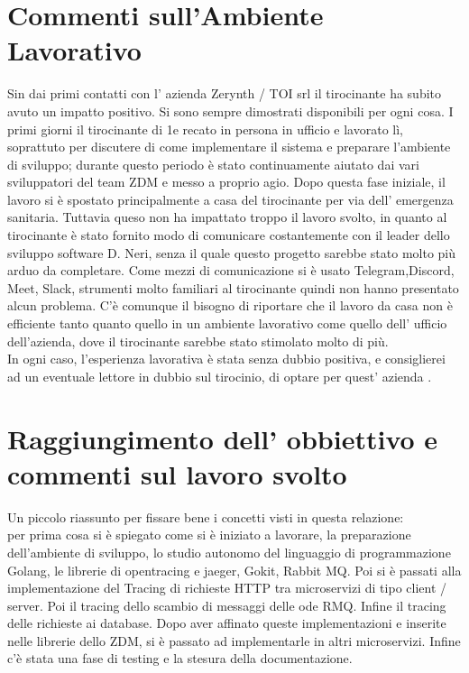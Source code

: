 \documentclass[a4paper,12pt,titlepage,italian,openany]{report}
\begin{document}
\section{Commenti sull'Ambiente Lavorativo}
Sin dai primi contatti con l' azienda Zerynth / TOI srl il tirocinante ha subito avuto un impatto positivo. Si sono sempre dimostrati disponibili per ogni cosa.
I primi giorni il tirocinante di 1e recato in persona in ufficio e lavorato lì, soprattuto per discutere di come implementare il sistema e preparare l'ambiente di sviluppo; durante questo periodo è stato continuamente aiutato dai vari sviluppatori del team ZDM\cite{zdm:1} e messo a proprio agio.
Dopo questa fase iniziale, il lavoro si è spostato principalmente a casa del tirocinante per via dell' emergenza sanitaria. Tuttavia queso non ha impattato troppo il lavoro svolto, in quanto al tirocinante è stato fornito modo di comunicare costantemente con il leader dello sviluppo software D. Neri, senza il quale questo progetto sarebbe stato molto più arduo da completare.
Come mezzi di comunicazione si è usato Telegram,Discord, Meet, Slack, strumenti molto familiari al tirocinante quindi non hanno presentato alcun problema. C'è comunque il bisogno di riportare che il lavoro da casa non è efficiente tanto quanto quello in un ambiente lavorativo come quello dell' ufficio dell'azienda, dove il tirocinante sarebbe stato stimolato molto di più. 
\\ In ogni caso, l'esperienza lavorativa è stata senza dubbio positiva, e consiglierei ad un eventuale lettore in dubbio sul tirocinio, di optare per quest' azienda .


\section{Raggiungimento dell' obbiettivo e commenti sul lavoro svolto}
Un piccolo riassunto per fissare bene i concetti visti in questa relazione:\\
per prima cosa si è spiegato come si è iniziato a lavorare, la preparazione dell'ambiente di sviluppo, lo studio autonomo del linguaggio di programmazione Golang, le librerie di opentracing e jaeger, Gokit, Rabbit MQ. Poi si è passati alla implementazione del Tracing
di richieste HTTP tra microservizi di tipo client / server. Poi il tracing dello scambio di messaggi delle ode RMQ. Infine  il tracing delle richieste ai database.
Dopo aver affinato queste implementazioni e inserite nelle librerie dello ZDM\cite{zdm:1}, si è passato ad implementarle in altri microservizi. Infine c'è stata una fase di testing e la stesura della documentazione.
\end{document}
